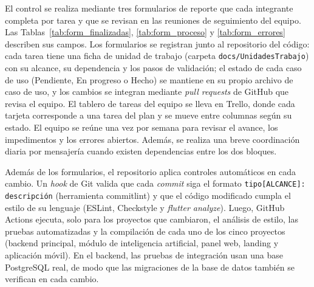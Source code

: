 El control se realiza mediante tres formularios de reporte que cada integrante completa por tarea y que se revisan en las reuniones de seguimiento del equipo. Las Tablas~\ref{tab:form_finalizadas}, \ref{tab:form_proceso} y \ref{tab:form_errores} describen sus campos. Los formularios se registran junto al repositorio del código: cada tarea tiene una ficha de unidad de trabajo (carpeta \texttt{docs/UnidadesTrabajo}) con su alcance, su dependencia y los pasos de validación; el estado de cada caso de uso (Pendiente, En progreso o Hecho) se mantiene en su propio archivo de caso de uso, y los cambios se integran mediante \textit{pull requests} de GitHub que revisa el equipo. El tablero de tareas del equipo se lleva en Trello, donde cada tarjeta corresponde a una tarea del plan y se mueve entre columnas según su estado. El equipo se reúne una vez por semana para revisar el avance, los impedimentos y los errores abiertos. Además, se realiza una breve coordinación diaria por mensajería cuando existen dependencias entre los dos bloques.

Además de los formularios, el repositorio aplica controles automáticos en cada cambio. Un \textit{hook} de Git valida que cada \textit{commit} siga el formato \texttt{tipo[ALCANCE]: descripción} (herramienta commitlint) y que el código modificado cumpla el estilo de su lenguaje (ESLint, Checkstyle y \textit{flutter analyze}). Luego, GitHub Actions ejecuta, solo para los proyectos que cambiaron, el análisis de estilo, las pruebas automatizadas y la compilación de cada uno de los cinco proyectos (backend principal, módulo de inteligencia artificial, panel web, landing y aplicación móvil). En el backend, las pruebas de integración usan una base PostgreSQL real, de modo que las migraciones de la base de datos también se verifican en cada cambio.

